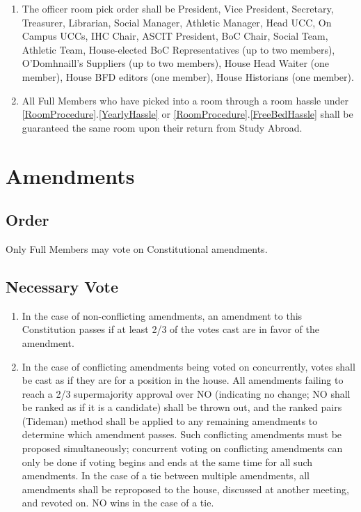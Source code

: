 \documentclass[10pt]{article} %
\begin{document}
\begin{enumerate}
\begin{enumerate}
\end{enumerate}
\item \label{OfficerRoomOrder}The officer room pick order shall be President, Vice President, Secretary, Treasurer, Librarian, Social Manager, Athletic Manager, Head UCC, On Campus UCCs, IHC Chair, ASCIT President, BoC Chair, Social Team, Athletic Team, House-elected BoC Representatives (up to two members), O’Domhnaill’s Suppliers (up to two members), House Head Waiter (one member), House BFD editors (one member), House Historians (one member).
\item All Full Members who have picked into a room through a room hassle under \ref{RoomProcedure}.\ref{YearlyHassle} or \ref{RoomProcedure}.\ref{FreeBedHassle} shall be guaranteed the same room upon their return from Study Abroad.
\end{enumerate}
\section{Amendments}
\subsection{Order}
Only Full Members may vote on Constitutional amendments.
\subsection{Necessary Vote}
\begin{enumerate}
\item In the case of non-conflicting amendments, an amendment to this Constitution passes if at least 2/3 of the votes cast are in favor of the amendment.
\item In the case of conflicting amendments being voted on concurrently, votes shall be cast as if they are for a position in the house. All amendments failing to reach a 2/3 supermajority approval over NO (indicating no change; NO shall be ranked as if it is a candidate) shall be thrown out, and the ranked pairs (Tideman) method shall be applied to any remaining amendments to determine which amendment passes. Such conflicting amendments must be proposed simultaneously; concurrent voting on conflicting amendments can only be done if voting begins and ends at the same time for all such amendments. In the case of a tie between multiple amendments, all amendments shall be reproposed to the house, discussed at another meeting, and revoted on. NO wins in the case of a tie.
\end{enumerate}
\end{document}
